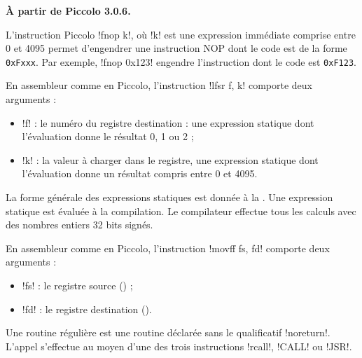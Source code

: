 

\textbf{À partir de Piccolo 3.0.6.}

L'instruction Piccolo \pic!fnop k!, où \pic!k! est une expression immédiate comprise entre 0 et 4095 permet d'engendrer une instruction NOP dont le code est de la forme \texttt{0xFxxx}. Par exemple, \pic!fnop 0x123! engendre l'instruction dont le code est \texttt{0xF123}.


En assembleur comme en Piccolo, l'instruction \pic!lfsr f, k! comporte deux arguments :
\begin{itemize}
  \item \pic!f! : le numéro du registre destination : une expression statique dont l’évaluation donne le résultat 0, 1 ou 2 ;
  \item \pic!k! : la valeur à charger dans le registre, une expression statique dont l’évaluation donne un résultat compris entre 0 et 4095.
\end{itemize}

La forme générale des expressions statiques est donnée à la . Une expression statique est évaluée à la compilation. Le compilateur effectue tous les calculs avec des nombres entiers 32 bits signés.








En assembleur comme en Piccolo, l'instruction \pic!movff fs, fd! comporte deux arguments :
\begin{itemize}
  \item \pic!fs! : le registre source () ;
  \item \pic!fd! : le registre destination ().
\end{itemize}









Une routine régulière est une routine déclarée sans le qualificatif \pic!noreturn!. L'appel s’effectue au moyen d’une des trois instructions \pic!rcall!, \pic!CALL! ou \pic!JSR!.


